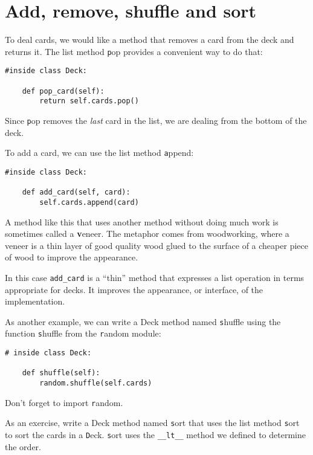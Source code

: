 \documentclass[
DIV=11,
fontsize=13,
twoside,
headinclude=false,
titlepage=firstiscover,
abstract=true,
headsepline=true,
footsepline=true,
chapterprefix=true, %
headings=big,
bibliography=totoc,%
captions=tableheading
]{scrbook}
\theoremstyle{definition}
\begin{document}
\section{Add, remove, shuffle and sort}

To deal cards, we would like a method that
removes a card from the deck and returns it.
The list method {\texttt pop} provides a convenient way to do that:

\begin{lstlisting}
#inside class Deck:

    def pop_card(self):
        return self.cards.pop()
\end{lstlisting}
%
Since {\texttt pop} removes the {\em last} card in the list, we are
dealing from the bottom of the deck.

To add a card, we can use the list method {\texttt append}:

\begin{lstlisting}
#inside class Deck:

    def add_card(self, card):
        self.cards.append(card)
\end{lstlisting}
%
A method like this that uses another method without doing
much work is sometimes called a {\textbf veneer}.  The metaphor
comes from woodworking, where a veneer is a thin
layer of good quality wood glued to the surface of a cheaper piece of
wood to improve the appearance.

In this case \verb"add_card" is a ``thin'' method that expresses
a list operation in terms appropriate for decks.  It
improves the appearance, or interface, of the
implementation.

As another example, we can write a Deck method named {\texttt shuffle}
using the function {\texttt shuffle} from the {\texttt random} module:

\begin{lstlisting}
# inside class Deck:
            
    def shuffle(self):
        random.shuffle(self.cards)
\end{lstlisting}
%
Don't forget to import {\texttt random}.

As an exercise, write a Deck method named {\texttt sort} that uses the
list method {\texttt sort} to sort the cards in a {\texttt Deck}.  {\texttt sort}
uses the \verb"__lt__" method we defined to determine the order.
 
\end{document}
